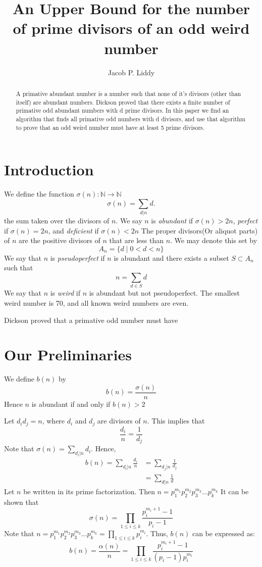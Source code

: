 \documentclass[]{article}
\title{An Upper Bound for the number of prime divisors of an odd weird number}
\author{Jacob P. Liddy}
\begin{document}
\maketitle

\begin{abstract}
A primative abundant number is a number such that none of it's divisors (other than itself) are abundant numbers. Dickson proved that there exists a finite number of primative odd abundant numbers with d prime divisors. In this paper we find an algorithm that finds all primative odd numbers with d divisors, and use that algorithm to prove that an odd weird number must have at least 5 prime divisors.
\end{abstract}

\section{Introduction}
We define the function $\sigma(n):\mathbb{N} \rightarrow \mathbb{N}$
$$\sigma(n) = \sum_{d|n}d.$$
the sum taken over the divisors of $n$. We say $n$ is \textit{abundant} if $\sigma(n) > 2n$, \textit{perfect} if $\sigma(n) = 2n$, and \textit{deficient} if $\sigma(n) < 2n$ The proper divisors(Or aliquot parts) of $n$ are the positive divisors of $n$ that are less than $n$. We may denote this set by
$$\textit{A}_{n} = \{d \mid 0 < d < n\}$$
We say that $n$ is \textit{pseudoperfect} if $n$ is abundant and there exists a subset $S \subset \textit{A}_{n} $ such that
$$ n = \sum_{d \in S} d$$
We say that $n$ is \textit{weird} if $n$ is abundant but not pseudoperfect. The smallest weird number is 70, and all known weird numbers are even.



Dickson proved that a primative odd number must have  
\section{Our Preliminaries}

We define $b(n)$ by
$$b(n) = \frac{\sigma(n)}{n}$$
Hence $n$ is abundant if and only if $b(n) > 2$

Let $d_i d_j = n$, where $d_{i}$ and $d_{j}$ are divisors of $n$. This implies that 
$$\frac{d_i}{n} = \frac{1}{d_j}$$
Note that $\sigma(n) = \sum_{d_{i}|n} d_{i}$. Hence,
	\begin{align*}
		b(n) = \sum_{d_{i}|n} \frac{d_{i}}{n} &= \sum_{d_{j}|n} \frac{1}{d_{j}}\\
		&= \sum_{d|n} \frac{1}{d}
	\end{align*}
Let $n$ be written in its prime factorization. Then $n=p_1^{m_1}p_2^{m_2}p_3^{m_3}...p_{k}^{m_k}$ It can be shown that $$\sigma(n) = \prod_{1 \leq i \leq k} \frac{p_i^{m_i + 1} -1}{p_i -1}$$
Note that $n = p_1^{m_1}p_2^{m_2}p_3^{m_3}...p_k^{m_k} = \prod_{1 \leq i \leq k} p_i^{m_i}$. Thus, $b(n)$ can be expressed as:
$$b(n) = \frac{\alpha(n)}{n} = \prod_{1 \leq i \leq k} \frac{p_i^{m_i + 1} -1}{(p_i -1)p_{i}^{m_{i}}}$$
\end{document}
